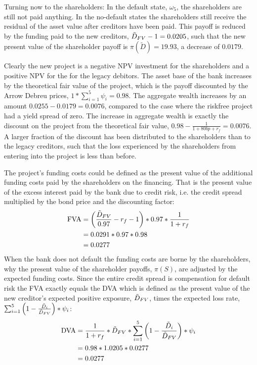 \documentclass[10pt,a4paper]{article}
\begin{document}
        Turning now to the shareholders: In the default state, $\omega_{5}$, the shareholders are still not paid anything. In the no-default states the shareholders still receive the residual of the asset value after creditors have been paid. This payoff is reduced by the funding paid to the new creditors, $\tilde{D}_{FV} - 1 = 0.0205$, such that the new present value of the shareholder payoff is $\pi(\tilde{D}) = 19.93$, a decrease of $0.0179$.

        Clearly the new project is a negative NPV investment for the shareholders and a positive NPV for the for the legacy debitors. The asset base of the bank increases by the theoretical fair value of the project, which is the payoff discounted by the Arrow Debreu prices, $1*\sum_{i=1}^{5} \psi_{i} = 0.98$. The aggregate wealth increases by an amount $0.0255 - 0.0179 = 0.0076$, compared to the case where the riskfree project had a yield spread of zero. The increase in aggregate wealth is exactly the discount on the project from the theoretical fair value, $0.98 - \frac{1}{1 + 80bp + r_{f}} = 0.0076$. A larger fraction of the discount has been distributed to the shareholders than to the legacy creditors, such that the loss experienced by the shareholders from entering into the project is less than before.

        The project's funding costs could be defined as the present value of the additional funding costs paid by the shareholders on the financing. That is the present value of the excess interest paid by the bank due to credit risk, i.e. the credit spread multiplied by the bond price and the discounting factor:
            \begin{align}
                \text{FVA} 
                    &= \left(\frac{\tilde{D}_{FV}}{0.97} - r_{f} - 1\right) * 0.97 * \frac{1}{1 + r_{f}} \\
                    &= 0.0291 * 0.97 * 0.98 \\
                    &= 0.0277
            \end{align}
        When the bank does not default the funding costs are borne by the shareholders, why the present value of the shareholder payoffs, $\pi(S)$, are adjusted by the expected funding costs. Since the entire credit spread is compensation for default risk the FVA exactly equals the DVA which is defined as the present value of the new creditor's expected positive exposure, $\tilde{D}_{FV}$, times the expected loss rate, $\sum_{i=1}^{5} \left(1 - \frac{\tilde{D}_{i}}{\tilde{D}_{FV}}\right) * \psi_{i}$:
            \begin{align}
                \text{DVA} 
                    &= \frac{1}{1 + r_{f}} 
                        * \tilde{D}_{FV} 
                        * \sum_{i=1}^{5} \left(
                            1 - \frac{\tilde{D}_{i}}{\tilde{D}_{FV}}
                        \right) 
                        * \psi_{i} \\
                    &= 0.98 * 1.0205 * 0.0277 \\
                    &= 0.0277
            \end{align}
\end{document}

